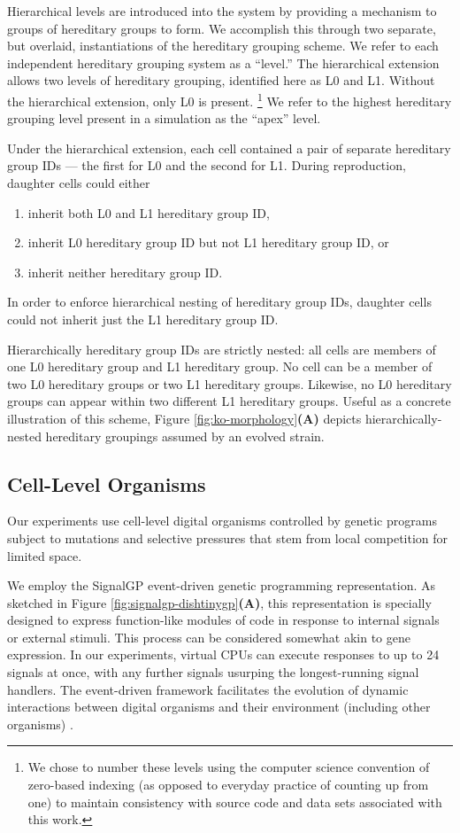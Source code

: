 Hierarchical levels are introduced into the system by providing a mechanism to groups of hereditary groups to form.
We accomplish this through two separate, but overlaid, instantiations of the hereditary grouping scheme.
We refer to each independent hereditary grouping system as a ``level.''
The hierarchical extension allows two levels of hereditary grouping, identified here as L0 and L1.
Without the hierarchical extension, only L0 is present.
\footnote{
We chose to number these levels using the computer science convention of zero-based indexing (as opposed to everyday practice of counting up from one) to maintain consistency with source code and data sets associated with this work.
}
We refer to the highest hereditary grouping level present in a simulation as the ``apex'' level.

Under the hierarchical extension, each cell contained a pair of separate hereditary group IDs --- the first for L0 and the second for L1.
During reproduction, daughter cells could either
\begin{enumerate}
\item inherit both L0 and L1 hereditary group ID,
\item inherit L0 hereditary group ID but not L1 hereditary group ID, or
\item inherit neither hereditary group ID.
\end{enumerate}
In order to enforce hierarchical nesting of hereditary group IDs, daughter cells could not inherit just the L1 hereditary group ID.

Hierarchically hereditary group IDs are strictly nested: all cells are members of one L0 hereditary group and L1 hereditary group.
No cell can be a member of two L0 hereditary groups or two L1 hereditary groups.
Likewise, no L0 hereditary groups can appear within two different L1 hereditary groups.
Useful as a concrete illustration of this scheme, Figure \ref{fig:ko-morphology}\textbf{(A)} depicts hierarchically-nested hereditary groupings assumed by an evolved strain.

\subsection{Cell-Level Organisms}

Our experiments use cell-level digital organisms controlled by genetic programs subject to mutations and selective pressures that stem from local competition for limited space.

We employ the SignalGP event-driven genetic programming representation.
As sketched in Figure \ref{fig:signalgp-dishtinygp}\textbf{(A)}, this representation is specially designed to express function-like modules of code in response to internal signals or external stimuli.
This process can be considered somewhat akin to gene expression.
In our experiments, virtual CPUs can execute responses to up to 24 signals at once, with any further signals usurping the longest-running signal handlers.
The event-driven framework facilitates the evolution of dynamic interactions between digital organisms and their environment (including other organisms) \citep{lalejini2018evolving}.

